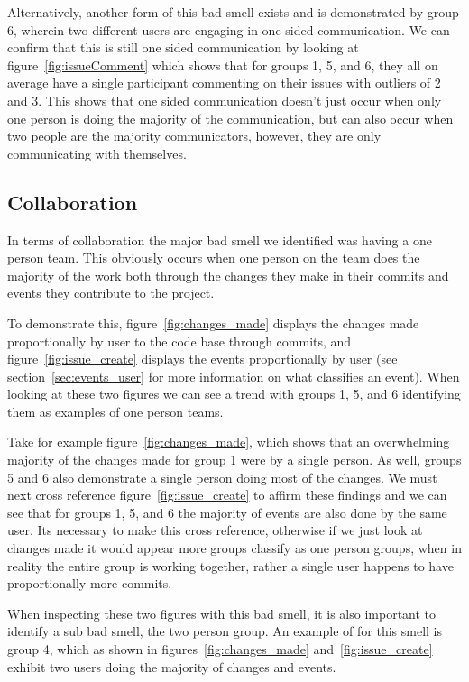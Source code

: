 \documentclass{acm_proc_article-sp}
\begin{document}
Alternatively, another form of this bad smell exists and is demonstrated by group 6, wherein two different users are engaging in one sided communication. We can confirm that this is still one sided communication by looking at figure~\ref{fig:issueComment} which shows that for groups 1, 5, and 6, they all on average have a single participant commenting on their issues with outliers of 2 and 3. This shows that one sided communication doesn't just occur when only one person is doing the majority of the communication, but can also occur when two people are the majority communicators, however, they are only communicating with themselves.

\subsection{Collaboration}

In terms of collaboration the major bad smell we identified was having a one person team. This obviously occurs when one person on the team does the majority of the work both through the changes they make in their commits and events they contribute to the project.

To demonstrate this, figure~\ref{fig:changes_made} displays the changes made proportionally by user to the code base through commits, and figure~\ref{fig:issue_create} displays the events proportionally by user (see section~\ref{sec:events_user} for more information on what classifies an event). When looking at these two figures we can see a trend with groups 1, 5, and 6 identifying them as examples of one person teams.

Take for example figure~\ref{fig:changes_made}, which shows that an overwhelming majority of the changes made for group 1 were by a single person. As well, groups 5 and 6 also demonstrate a single person doing most of the changes.  We must next cross reference figure~\ref{fig:issue_create} to affirm these findings and we can see that for groups 1, 5, and 6 the majority of events are also done by the same user. Its necessary to make this cross reference, otherwise if we just look at changes made it would appear more groups classify as one person groups, when in reality the entire group is working together, rather a single user happens to have proportionally more commits.

When inspecting these two figures with this bad smell, it is also important to identify a sub bad smell, the two person group. An example of for this smell is group 4, which as shown in figures~\ref{fig:changes_made} and~\ref{fig:issue_create} exhibit two users doing the majority of changes and events. 
\end{document}
